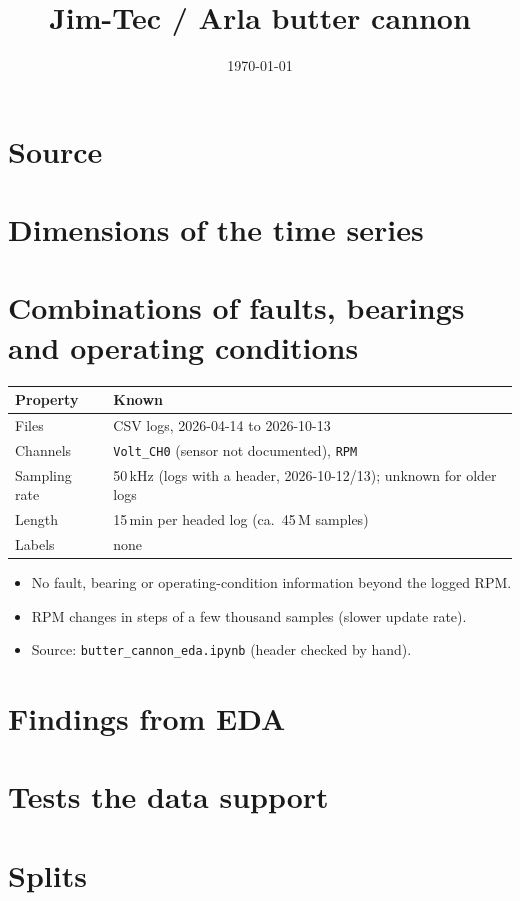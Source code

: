 \documentclass[11pt,a4paper]{article}
\title{Jim-Tec / Arla butter cannon}
\author{}
\date{\today}
\begin{document}
\maketitle

\section{Source}

\section{Dimensions of the time series}

\section{Combinations of faults, bearings and operating conditions}

\begin{table}[h]
\centering
\small
\begin{tabular}{ll}
\toprule
Property & Known \\
\midrule
Files         & CSV logs, 2026-04-14 to 2026-10-13 \\
Channels      & \texttt{Volt\_CH0} (sensor not documented), \texttt{RPM} \\
Sampling rate & 50\,kHz (logs with a header, 2026-10-12/13); unknown for older logs \\
Length        & 15\,min per headed log (ca.\ 45\,M samples) \\
Labels        & none \\
\bottomrule
\end{tabular}
\end{table}

\begin{itemize}
  \item No fault, bearing or operating-condition information beyond the logged RPM.
  \item RPM changes in steps of a few thousand samples (slower update rate).
  \item Source: \texttt{butter\_cannon\_eda.ipynb} (header checked by hand).
\end{itemize}

\section{Findings from EDA}

\section{Tests the data support}

\section{Splits}
\end{document}
